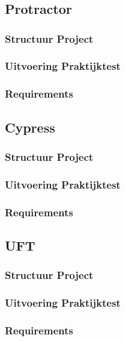 
\chapter{}
\label{ch:corpus}

\section{Protractor}

\subsection{Structuur Project}

\subsection{Uitvoering Praktijktest}

\subsection{Requirements}

\section{Cypress}

\subsection{Structuur Project}

\subsection{Uitvoering Praktijktest}

\subsection{Requirements}

\section{UFT}

\subsection{Structuur Project}

\subsection{Uitvoering Praktijktest}

\subsection{Requirements}